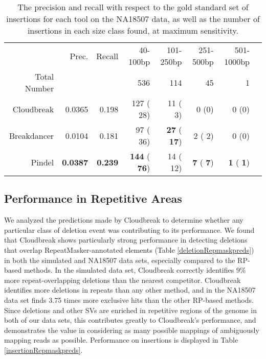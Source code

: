 \documentclass[11pt]{article}
\begin{document}
\begin{table}[t]
\begin{center}
\begin{tabular}{rrr|rrrrr}
  \hline
 & Prec. & Recall & 40-100bp & 101-250bp & 251-500bp & 501-1000bp \\ 
Total Number & & & 536 & 114 & 45 & 1 \\
  \hline
Cloudbreak & 0.0365 & 0.198 &  127 (  28)  &   11 (   3) &  0 (0) & 0 (0) \\ 
Breakdancer & 0.0104 & 0.181 &   97 (  36)  & \textbf{  27} (\textbf{  17}) &     2 (   2) & 0 (0) \\  
  Pindel & \textbf{0.0387} & \textbf{0.239} & \textbf{ 144} (\textbf{  76})  &   14 (  12) &  \textbf{   7} (\textbf{   7}) & \textbf{   1} (\textbf{   1})  \\ 
   \hline
\end{tabular}
\end{center}
\caption{The precision and recall with respect to the gold standard set of insertions for each tool on the NA18507 data, as well as the number of insertions in each size class found, at maximum sensitivity.}
\label{NA18507InsertionPreds}
\end{table}

\subsection{Performance in Repetitive Areas}

We analyzed the predictions made by Cloudbreak to determine whether any particular class of deletion event was contributing to its performance. We found that Cloudbreak shows particularly strong performance in detecting deletions that overlap RepeatMasker-annotated elements (Table \ref{deletionRepmaskpreds}) in both the simulated and NA18507 data sets, especially compared to the RP-based methods. In the simulated data set, Cloudbreak correctly identifies 9\% more repeat-overlapping deletions than the nearest competitor. Cloudbreak identifies more deletions in repeats than any other method, and in the NA18507 data set finds 3.75 times more exclusive hits than the other RP-based methods. Since deletions and other SVs are enriched in repetitive regions of the genome in both of our data sets, this contributes greatly to Cloudbreak's performance, and demonstrates the value in considering as many possible mappings of ambiguously mapping reads as possible. Performance on insertions is displayed in Table \ref{insertionRepmaskpreds}.
\end{document}

